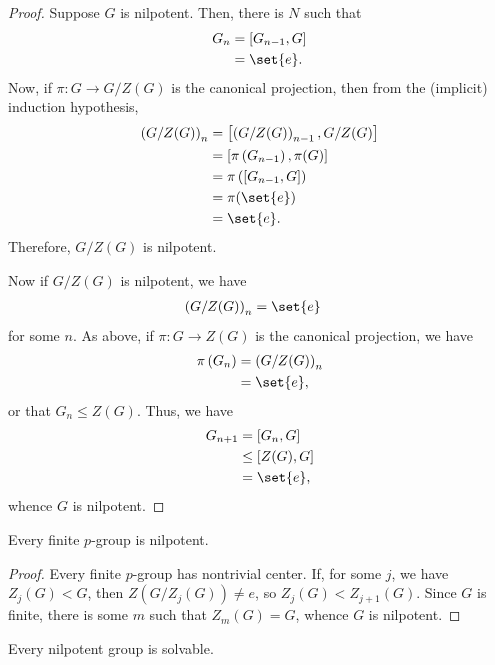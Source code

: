 \documentclass[10pt]{mypackage}
\begin{document}
\begin{proof}
  Suppose $G$ is nilpotent. Then, there is $N$ such that
  \begin{align*}
    G_n &= \left[ G_{n-1},G \right]\\
        &= \set{e}.
  \end{align*}
  Now, if $\pi\colon G\rightarrow G/Z(G)$ is the canonical projection, then from the (implicit) induction hypothesis,
  \begin{align*}
    \left( G/Z(G) \right)_n &= \left[ \left( G/Z(G) \right)_{n-1},G/Z(G) \right]\\
                            &= \left[ \pi\left( G_{n-1} \right),\pi(G) \right]\\
                            &= \pi\left( \left[ G_{n-1},G \right] \right)\\
                            &= \pi(\set{e})\\
                            &= \set{e}.
  \end{align*}
  Therefore, $G/Z(G)$ is nilpotent.

  Now if $G/Z(G)$ is nilpotent, we have
  \begin{align*}
    \left( G/Z(G) \right)_n &= \set{e}
  \end{align*}
  for some $n$. As above, if $\pi\colon G\rightarrow Z(G)$ is the canonical projection, we have
  \begin{align*}
    \pi\left( G_n \right) &= \left( G/Z(G) \right)_n\\
                          &= \set{e},
  \end{align*}
  or that $G_n\leq Z(G)$. Thus, we have
  \begin{align*}
    G_{n+1} &= \left[ G_{n},G \right]\\
            &\leq \left[ Z(G),G \right]\\
            &= \set{e},
  \end{align*}
  whence $G$ is nilpotent.
\end{proof}
\begin{theorem}
  Every finite $p$-group is nilpotent.
\end{theorem}
\begin{proof}
  Every finite $p$-group has nontrivial center. If, for some $j$, we have $Z_j(G) < G$, then $Z\left( G/Z_j(G) \right) \neq e$, so $Z_j(G) < Z_{j+1}(G)$. Since $G$ is finite, there is some $m$ such that $Z_m(G) = G$, whence $G$ is nilpotent.
\end{proof}
\begin{theorem}
  Every nilpotent group is solvable.
\end{theorem}
\end{document}
